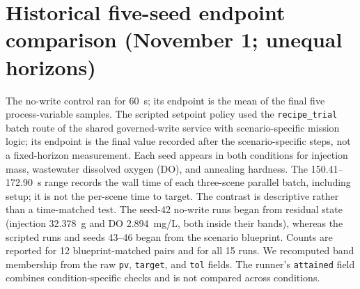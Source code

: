 \documentclass[10pt]{article}
\begin{document}
\section*{Historical five-seed endpoint comparison (November 1; unequal horizons)}
The no-write control ran for 60~s; its endpoint is the mean of the final five process-variable samples. The scripted setpoint policy used the \texttt{recipe\_trial} batch route of the shared governed-write service with scenario-specific mission logic; its endpoint is the final value recorded after the scenario-specific steps, not a fixed-horizon measurement. Each seed appears in both conditions for injection mass, wastewater dissolved oxygen (DO), and annealing hardness. The 150.41--172.90~s range records the wall time of each three-scene parallel batch, including setup; it is not the per-scene time to target. The contrast is descriptive rather than a time-matched test. The seed-42 no-write runs began from residual state (injection 32.378~g and DO 2.894~mg/L, both inside their bands), whereas the scripted runs and seeds 43--46 began from the scenario blueprint. Counts are reported for 12 blueprint-matched pairs and for all 15 runs. We recomputed band membership from the raw \texttt{pv}, \texttt{target}, and \texttt{tol} fields. The runner's \texttt{attained} field combines condition-specific checks and is not compared across conditions.
\end{document}
